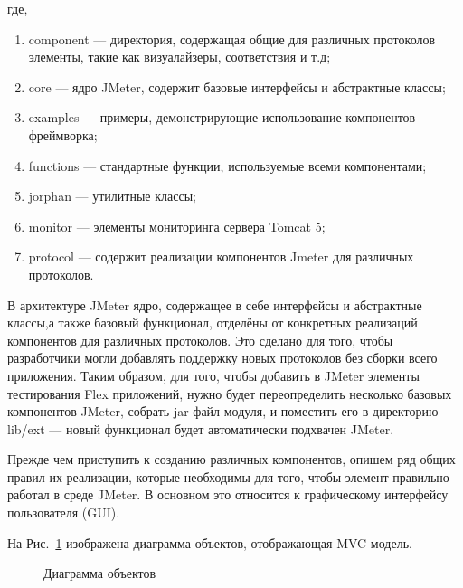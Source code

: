 где,
\begin{enumerate}
\item component --- директория, содержащая общие для различных протоколов элементы, такие как визуалайзеры,
соответствия и т.д;
\item core --- ядро JMeter, содержит базовые интерфейсы и абстрактные классы;
\item examples --- примеры, демонстрирующие использование компонентов фреймворка;
\item functions --- стандартные функции, используемые всеми компонентами;
\item jorphan --- утилитные классы;
\item monitor --- элементы мониторинга сервера Tomcat 5;
\item protocol --- содержит реализации компонентов Jmeter для различных протоколов.
\end{enumerate}

В архитектуре JMeter ядро, содержащее в себе интерфейсы и абстрактные классы,а также базовый функционал,
отделёны от конкретных реализаций компонентов для различных протоколов. Это сделано для того, чтобы разработчики
могли добавлять поддержку новых протоколов без сборки всего приложения. Таким образом, для того, чтобы добавить
в JMeter элементы тестирования Flex приложений, нужно будет переопределить несколько базовых
компонентов JMeter, собрать jar файл модуля, и поместить его в директорию lib/ext --- новый функционал будет
автоматически подхвачен JMeter.

Прежде чем приступить к созданию различных компонентов, опишем ряд общих правил их реализации,
которые необходимы для того, чтобы элемент правильно работал в среде JMeter. В основном это относится к
графическому интерфейсу пользователя (GUI).

На Рис.~\ref{ris:Diagram2.png} изображена диаграмма объектов, отображающая MVC модель.

\begin{figure}[ht]
\caption{Диаграмма объектов}
\label{ris:Diagram2.png}
\end{figure}

